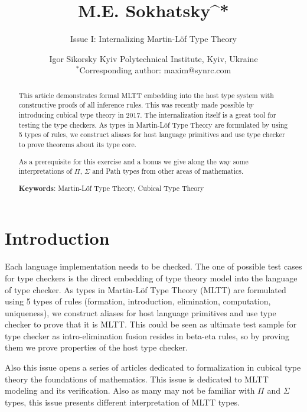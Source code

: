 \documentclass[twoside]{article}
\theoremstyle{definition}
\begin{document}
\title{\small M.E. Sokhatsky^{*}}
\author{\Huge Issue I: Internalizing Martin-Löf Type Theory}
\date{ Igor Sikorsky Kyiv Polytechnical Institute, Kyiv, Ukraine\\
       \small $^*$Corresponding author: maxim@synrc.com}

\maketitle
\thispagestyle{empty}

\begin{abstract}
This article demonstrates formal MLTT embedding into the host type system
with constructive proofs of all inference rules. This was recently made possible
by introducing cubical type theory in 2017. The internalization itself is a great
tool for testing the type checkers. As types in Martin-Löf Type Theory are formulated
by using 5 types of rules, we construct aliases for host language primitives
and use type checker to prove theorems about its type core.

As a prerequisite for this exercise and a bonus we give along the way
some interpretations of $\Pi$, $\Sigma$ and Path types from other
areas of mathematics.

{\bf Keywords}: Martin-Löf Type Theory, Cubical Type Theory
\end{abstract}

\section*{Introduction}

Each language implementation needs to be checked. The one of possible test cases
for type checkers is the direct embedding of type theory model into the language of type checker.
As types in Martin-Löf Type Theory\cite{Lof72,Lof84} (MLTT) are formulated using 5 types of rules (formation,
introduction, elimination, computation, uniqueness), we construct aliases
for host language primitives and use type checker to prove that it is MLTT.
This could be seen as ultimate test sample for type checker as
intro-elimination fusion resides in beta-eta rules, so by proving them
we prove properties of the host type checker.

Also this issue opens a series of articles dedicated to formalization in
cubical type theory the foundations of mathematics. This issue is dedicated
to MLTT modeling and its verification. Also as many may not be familiar with
$\Pi$ and $\Sigma$ types, this issue presents different interpretation of MLTT types.
\end{document}

